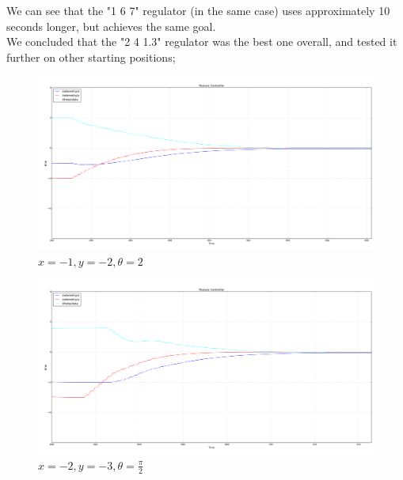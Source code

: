 \documentclass[a4paper,10pt]{article}
\begin{document}
		We can see that the "1 6 7" regulator (in the same case) uses approximately 10 seconds longer, but achieves the same goal.\\

		We concluded that the "2 4 1.3" regulator was the best one overall, and tested it further on other starting positions;



		\begin{figure}[H]
		\centering
		\includegraphics[width=1.1\textwidth]{rover2_rqt_plot91.png}
		\caption{ $x = -1,  y = -2,  \theta = 2$}	
 		\label{fig:35657}
		\end{figure}



		\begin{figure}[H]
		\centering
		\includegraphics[width=1.1\textwidth]{rover2_rqt_plot93_high_error.png}
		\caption{ $x = -2,  y = -3,  \theta=\frac{\pi}{2}$}	
 		\label{fig:334322}
		\end{figure}
\end{document}
